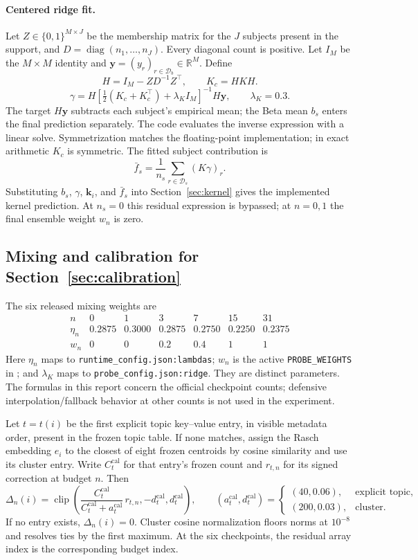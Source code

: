 \documentclass{article}
\begin{document}
\paragraph{Centered ridge fit.}
Let $Z\in\{0,1\}^{M\times J}$ be the membership matrix for the $J$ subjects present in the support, and $D=\operatorname{diag}(n_1,\ldots,n_J)$. Every diagonal count is positive. Let $I_M$ be the $M\times M$ identity and $\mathbf y=(y_r)_{r\in\mathcal D_b}\in\mathbb R^M$. Define
\[
 H=I_M-ZD^{-1}Z^\top,\qquad K_c=HKH.
\]
\[
 \gamma=H\left[\tfrac12(K_c+K_c^\top)+\lambda_K I_M\right]^{-1}H\mathbf y,
 \qquad\lambda_K=0.3.
\]
The target $H\mathbf y$ subtracts each subject's empirical mean; the Beta mean $b_s$ enters the final prediction separately. The code evaluates the inverse expression with a linear solve. Symmetrization matches the floating-point implementation; in exact arithmetic $K_c$ is symmetric. The fitted subject contribution is
\[
 \bar f_s=\frac{1}{n_s}\sum_{r\in\mathcal D_s}(K\gamma)_r.
\]
Substituting $b_s$, $\gamma$, $\mathbf k_i$, and $\bar f_s$ into Section~\ref{sec:kernel} gives the implemented kernel prediction. At $n_s=0$ this residual expression is bypassed; at $n=0,1$ the final ensemble weight $w_n$ is zero.

\subsection{Mixing and calibration for Section~\ref{sec:calibration}}\label{app:ensemble}

The six released mixing weights are
\[
\begin{array}{c|rrrrrr}
 n &0&1&3&7&15&31\\\hline
 \eta_n&0.2875&0.3000&0.2875&0.2750&0.2250&0.2375\\
 w_n&0&0&0.2&0.4&1&1
\end{array}
\]
Here $\eta_n$ maps to \texttt{runtime\_config.json:lambdas}; $w_n$ is the active \texttt{PROBE\_WEIGHTS} in ; and $\lambda_K$ maps to \texttt{probe\_config.json:ridge}. They are distinct parameters. The formulas in this report concern the official checkpoint counts; defensive interpolation/fallback behavior at other counts is not used in the experiment.

Let $t=t(i)$ be the first explicit topic key--value entry, in visible metadata order, present in the frozen topic table. If none matches, assign the Rasch embedding $e_i$ to the closest of eight frozen centroids by cosine similarity and use its cluster entry. Write $C_t^{\mathrm{cal}}$ for that entry's frozen count and $r_{t,n}$ for its signed correction at budget $n$. Then
\[
 \Delta_n(i)=\operatorname{clip}\!\left(
 \frac{C_t^{\mathrm{cal}}}{C_t^{\mathrm{cal}}+a_t^{\mathrm{cal}}}\,r_{t,n},
 -d_t^{\mathrm{cal}},d_t^{\mathrm{cal}}\right),\qquad
 (a_t^{\mathrm{cal}},d_t^{\mathrm{cal}})=
 \begin{cases}(40,0.06),&\text{explicit topic},\\(200,0.03),&\text{cluster}.
 \end{cases}
\]
If no entry exists, $\Delta_n(i)=0$. Cluster cosine normalization floors norms at $10^{-8}$ and resolves ties by the first maximum. At the six checkpoints, the residual array index is the corresponding budget index.
\end{document}

